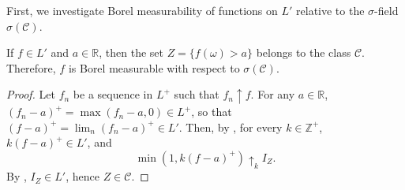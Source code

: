 First, we investigate Borel measurability of functions on \(L'\) relative to the \(\sigma\)-field \(\sigma(\mathcal{C})\).
\begin{lemm}\label{lemma:functions in L' are measurable}
		If \(f\in L'\) and \(a\in\mathbb{R}\), then the set \(Z=\{f(\omega)>a\}\) belongs to the class \(\mathcal{C}\). Therefore, \(f\) is Borel measurable with respect to \(\sigma(\mathcal{C})\).
\end{lemm}
\begin{proof}
		Let \(f_n\) be a sequence in \(L^{+}\) such that \(f_n\uparrow f\). For any \(a\in\mathbb{R}\), \((f_n-a)^{+}=\max(f_n-a,0)\in L^{+}\), so that \((f-a)^{+}=\lim_n(f_n-a)^{+}\in L'\). Then, by , for every \(k\in\mathbb{Z}^{+}\), \(k(f-a)^{+}\in L'\), and
		\[
				\min(1,k(f-a)^{+})\uparrow_k I_{Z}
		.\]
		By , \(I_Z\in L'\), hence \(Z\in\mathcal{C}\).
\end{proof}

